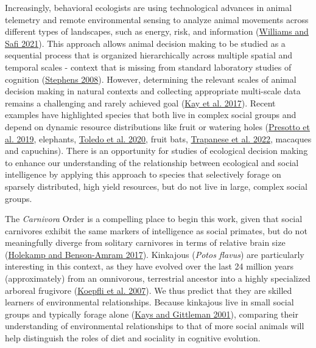 \documentclass[twoside,12pt,final]{ucthesis-CA2012}
\begin{document}
\begin{ucmainmatter}
Increasingly, behavioral ecologists are using technological advances in animal telemetry and remote environmental sensing to analyze animal movements across different types of landscapes, such as energy, risk, and information (\protect\hyperlink{ref-williams2021}{Williams and Safi 2021}). This approach allows animal decision making to be studied as a sequential process that is organized hierarchically across multiple spatial and temporal scales - context that is missing from standard laboratory studies of cognition (\protect\hyperlink{ref-stephens2008}{Stephens 2008}). However, determining the relevant scales of animal decision making in natural contexts and collecting appropriate multi-scale data remains a challenging and rarely achieved goal (\protect\hyperlink{ref-kay2017}{Kay et al. 2017}). Recent examples have highlighted species that both live in complex social groups and depend on dynamic resource distributions like fruit or watering holes (\protect\hyperlink{ref-presotto2019a}{Presotto et al. 2019}, elephants, \protect\hyperlink{ref-toledo2020}{Toledo et al. 2020}, fruit bats, \protect\hyperlink{ref-trapanese2022}{Trapanese et al. 2022}, macaques and capuchins). There is an opportunity for studies of ecological decision making to enhance our understanding of the relationship between ecological and social intelligence by applying this approach to species that selectively forage on sparsely distributed, high yield resources, but do not live in large, complex social groups.

The \emph{Carnivora} Order is a compelling place to begin this work, given that social carnivores exhibit the same markers of intelligence as social primates, but do not meaningfully diverge from solitary carnivores in terms of relative brain size (\protect\hyperlink{ref-holekamp2017}{Holekamp and Benson-Amram 2017}). Kinkajous (\emph{Potos flavus}) are particularly interesting in this context, as they have evolved over the last 24 million years (approximately) from an omnivorous, terrestrial ancestor into a highly specialized arboreal frugivore (\protect\hyperlink{ref-koepfli2007}{Koepfli et al. 2007}). We thus predict that they are skilled learners of environmental relationships. Because kinkajous live in small social groups and typically forage alone (\protect\hyperlink{ref-kays2001}{Kays and Gittleman 2001}), comparing their understanding of environmental relationships to that of more social animals will help distinguish the roles of diet and sociality in cognitive evolution.


\end{ucmainmatter}
\end{document}
